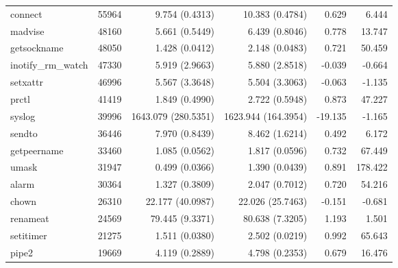 \begin{longtable}{>{\ttfamily}lrrrrr}
                        connect &      55964 &              9.754 (0.4313) &           10.383 (0.4784) &           0.629 &        6.444 \\
                        madvise &      48160 &              5.661 (0.5449) &            6.439 (0.8046) &           0.778 &       13.747 \\
                    getsockname &      48050 &              1.428 (0.0412) &            2.148 (0.0483) &           0.721 &       50.459 \\
             inotify\_rm\_watch &      47330 &              5.919 (2.9663) &            5.880 (2.8518) &          -0.039 &       -0.664 \\
                       setxattr &      46996 &              5.567 (3.3648) &            5.504 (3.3063) &          -0.063 &       -1.135 \\
                          prctl &      41419 &              1.849 (0.4990) &            2.722 (0.5948) &           0.873 &       47.227 \\
                         syslog &      39996 &         1643.079 (280.5351) &       1623.944 (164.3954) &         -19.135 &       -1.165 \\
                         sendto &      36446 &              7.970 (0.8439) &            8.462 (1.6214) &           0.492 &        6.172 \\
                    getpeername &      33460 &              1.085 (0.0562) &            1.817 (0.0596) &           0.732 &       67.449 \\
                          umask &      31947 &              0.499 (0.0366) &            1.390 (0.0439) &           0.891 &      178.422 \\
                          alarm &      30364 &              1.327 (0.3809) &            2.047 (0.7012) &           0.720 &       54.216 \\
                          chown &      26310 &            22.177 (40.0987) &          22.026 (25.7463) &          -0.151 &       -0.681 \\
                       renameat &      24569 &             79.445 (9.3371) &           80.638 (7.3205) &           1.193 &        1.501 \\
                      setitimer &      21275 &              1.511 (0.0380) &            2.502 (0.0219) &           0.992 &       65.643 \\
                          pipe2 &      19669 &              4.119 (0.2889) &            4.798 (0.2353) &           0.679 &       16.476 \\

\end{longtable}
